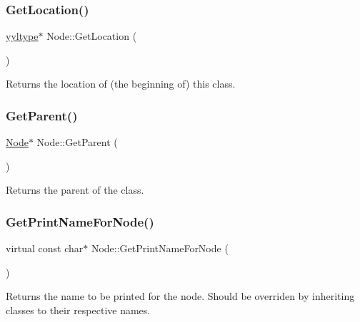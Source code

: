 \mbox{\label{class_node_a4cdeb731db84c3787e77be957f9474a1}} 
\subsubsection{\texorpdfstring{Get\+Location()}{GetLocation()}}
{\footnotesize\ttfamily \hyperlink{structyyltype}{yyltype}$\ast$ Node\+::\+Get\+Location (\begin{DoxyParamCaption}{ }\end{DoxyParamCaption})\hspace{0.3cm}{\ttfamily [inline]}}

Returns the location of (the beginning of) this class. \mbox{\label{class_node_a3c762d37b1cad8d617db9620784da897}} 
\subsubsection{\texorpdfstring{Get\+Parent()}{GetParent()}}
{\footnotesize\ttfamily \hyperlink{class_node}{Node}$\ast$ Node\+::\+Get\+Parent (\begin{DoxyParamCaption}{ }\end{DoxyParamCaption})\hspace{0.3cm}{\ttfamily [inline]}}

Returns the parent of the class. \mbox{\label{class_node_a56e29657306ffb004d69c6929ae44269}} 
\subsubsection{\texorpdfstring{Get\+Print\+Name\+For\+Node()}{GetPrintNameForNode()}}
{\footnotesize\ttfamily virtual const char$\ast$ Node\+::\+Get\+Print\+Name\+For\+Node (\begin{DoxyParamCaption}{ }\end{DoxyParamCaption})\hspace{0.3cm}{\ttfamily [pure virtual]}}

Returns the name to be printed for the node. Should be overriden by inheriting classes to their respective names. 


